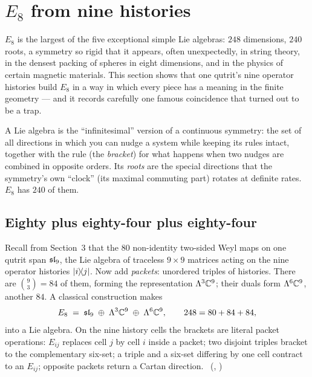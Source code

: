 \section{\texorpdfstring{$E_8$}{E8} from nine histories}
\label{sec:e8}

$E_8$ is the largest of the five exceptional simple Lie algebras: $248$ dimensions, $240$
roots, a symmetry so rigid that it appears, often unexpectedly, in string theory, in the
densest packing of spheres in eight dimensions, and in the physics of certain magnetic
materials. This section shows that one qutrit's nine operator histories build $E_8$ in a
way in which every piece has a meaning in the finite geometry --- and it records
carefully one famous coincidence that turned out to be a trap.

\begin{plainwords}
A Lie algebra is the ``infinitesimal'' version of a continuous symmetry: the set of all
directions in which you can nudge a system while keeping its rules intact, together with
the rule (the \emph{bracket}) for what happens when two nudges are combined in opposite
orders. Its \emph{roots} are the special directions that the symmetry's own ``clock''
(its maximal commuting part) rotates at definite rates. $E_8$ has $240$ of them.
\end{plainwords}

\subsection{Eighty plus eighty-four plus eighty-four}

Recall from Section~3 that the $80$ non-identity two-sided Weyl maps on one qutrit span
$\mathfrak{sl}_9$, the Lie algebra of traceless $9\times9$ matrices acting on the nine operator
histories $\lvert i\rangle\!\langle j\rvert$. Now add \emph{packets}: unordered triples of histories. There
are $\binom93=84$ of them, forming the representation $\Lambda^3\mathbb{C}^9$; their duals form
$\Lambda^6\mathbb{C}^9$, another $84$. A classical construction \cite{Adams1996,Baez2002} makes
\[
E_8 \;=\; \mathfrak{sl}_9\;\oplus\;\Lambda^3\mathbb{C}^9\;\oplus\;\Lambda^6\mathbb{C}^9,\qquad
248=80+84+84 ,
\]
into a Lie algebra. On the nine history cells the brackets are literal packet operations:
$E_{ij}$ replaces cell $j$ by cell $i$ inside a packet; two disjoint triples bracket to the
complementary six-set; a triple and a six-set differing by one cell contract to an
$E_{ij}$; opposite packets return a Cartan direction. \tierC\
(,
)

